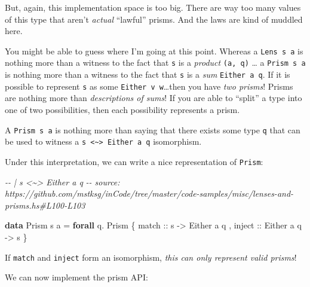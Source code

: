 \documentclass[]{article}
\newenvironment{Shaded}{}{}
\newcommand{\CommentTok}[1]{\textcolor[rgb]{0.38,0.63,0.69}{\textit{#1}}}
\newcommand{\DataTypeTok}[1]{\textcolor[rgb]{0.56,0.13,0.00}{#1}}
\newcommand{\KeywordTok}[1]{\textcolor[rgb]{0.00,0.44,0.13}{\textbf{#1}}}
\newcommand{\NormalTok}[1]{#1}
\newcommand{\OperatorTok}[1]{\textcolor[rgb]{0.40,0.40,0.40}{#1}}
\newcommand{\OtherTok}[1]{\textcolor[rgb]{0.00,0.44,0.13}{#1}}
\begin{document}
But, again, this implementation space is too big. There are way too many values
of this type that aren't \emph{actual} ``lawful'' prisms. And the laws are kind
of muddled here.

You might be able to guess where I'm going at this point. Whereas a
\texttt{Lens\textquotesingle{}\ s\ a} is nothing more than a witness to the fact
that \texttt{s} is a \emph{product} \texttt{(a,\ q)} \ldots{} a
\texttt{Prism\textquotesingle{}\ s\ a} is nothing more than a witness to the
fact that \texttt{s} is a \emph{sum} \texttt{Either\ a\ q}. If it is possible to
represent \texttt{s} as some \texttt{Either\ v\ w}\ldots then you have \emph{two
prisms}! Prisms are nothing more than \emph{descriptions of sums}! If you are
able to ``split'' a type into one of two possibilities, then each possibility
represents a prism.

A \texttt{Prism\textquotesingle{}\ s\ a} is nothing more than saying that there
exists some type \texttt{q} that can be used to witness a
\texttt{s\ \textless{}\textasciitilde{}\textgreater{}\ Either\ a\ q}
isomorphism.

Under this interpretation, we can write a nice representation of
\texttt{Prism\textquotesingle{}}:

\begin{Shaded}
\begin{Highlighting}[]
\CommentTok{{-}{-} | s <\textasciitilde{}> Either a q}
\CommentTok{{-}{-} source: https://github.com/mstksg/inCode/tree/master/code{-}samples/misc/lenses{-}and{-}prisms.hs\#L100{-}L103}

\KeywordTok{data} \DataTypeTok{Prism\textquotesingle{}}\NormalTok{ s a }\OtherTok{=} \KeywordTok{forall}\NormalTok{ q}\OperatorTok{.} \DataTypeTok{Prism\textquotesingle{}}
\NormalTok{    \{}\OtherTok{ match  ::}\NormalTok{ s }\OtherTok{{-}>} \DataTypeTok{Either}\NormalTok{ a q}
\NormalTok{    ,}\OtherTok{ inject ::} \DataTypeTok{Either}\NormalTok{ a q }\OtherTok{{-}>}\NormalTok{ s}
\NormalTok{    \}}
\end{Highlighting}
\end{Shaded}

If \texttt{match} and \texttt{inject} form an isomorphism, \emph{this can only
represent valid prisms}!

We can now implement the prism API:
\end{document}
